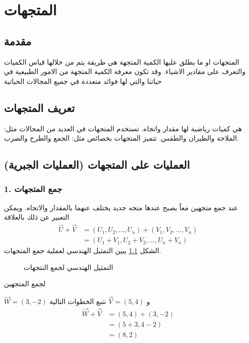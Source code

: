 \chapter{المتجهات}

\section{مقدمة}
المتجهات او ما يطلق عليها الكمية المتجهة هي طريقة يتم من خلالها قياس الكميات والتعرف على مقادير الاشياء. وقد تكون معرفة الكمية المتجهة من الامور الطبيعية في حياتنا والتي لها فوائد متعددة في جميع المجالات الحياتية

\section{تعريف المتجهات}
هي كميات رياضية لها مقدار واتجاه. تستخدم المتجهات في العديد من المجالات مثل: الملاحة والطيران والطقس. تتميز المتجهات بخصائص مثل: الجمع والطرح والضرب.

\section{العمليات على المتجهات (العمليات الجبرية)}
\subsection*{1. جمع المتجهات}
عند جمع متجهين معاً يصبح عندها متجه جديد يختلف عنهما بالمقدار والاتجاه. ويمكن التعبير عن ذلك بالعلاقة
\begin{align*}
	\vec{U} + \vec{V} &= (U_1, U_2, \dots, U_n) + (V_1, V_2, \dots, V_n)\\
	&= (U_1+V_1, U_2+V_2, \dots, U_n+V_n)
\end{align*}
الشكل \ref{fig:vecsum} يبين التمثيل الهندسي لعملية جمع المتجهات.
	\begin{figure}[ht]
	\centering
	\caption{التمثيل الهندسي لجمع النتجهات}
			\label{fig:vecsum}
\end{figure}
\newpage
\begin{example}
لجمع المتجهين
	
	$\vec{W} = (3,-2)$ و $\vec{V} = (5,4)$
	نتبع الخطوات التالية
	\begin{align*}
		\vec{W} + \vec{V} &= (5,4) + (3,-2)\\
		&= (5+3, 4-2)\\
		&= (8,2)
	\end{align*}
\end{example}


